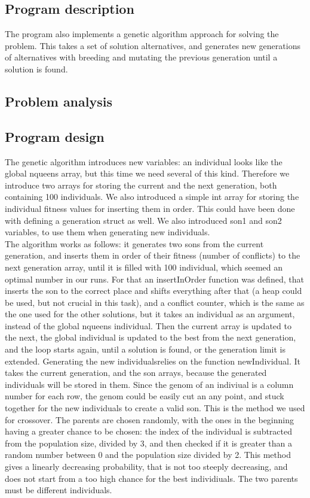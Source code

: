 \documentclass{article}
\begin{document}
\subsection*{Program description}
The program also implements a genetic algorithm approach for solving the problem. This takes a set of solution alternatives, and generates new generations of alternatives with breeding and mutating the previous generation until a solution is found.
\subsection*{Problem analysis}


\subsection*{Program design}
The genetic algorithm introduces new variables: an individual looks like the global nqueens array, but this time we need several of this kind. Therefore we introduce two arrays for storing the current and the next generation, both containing 100 individuals. We also introduced a simple int array for storing the individual fitness values for inserting them in order. This could have been done with defining a generation struct as well. We also introduced son1 and son2 variables, to use them when generating new individuals.\\
The algorithm works as follows: it generates two sons from the current generation, and inserts them in order of their fitness (number of conflicts) to the next generation array, until it is filled with 100 individual, which seemed an optimal number in our runs. For that an insertInOrder function was defined, that inserts the son to the correct place and shifts everything after that (a heap could be used, but not crucial in this task), and a conflict counter, which is the same as the one used for the other solutions, but it takes an individual as an argument, instead of the global nqueens individual. Then the current array is updated to the next, the global individual is updated to the best from the next generation, and the loop starts again, until a solution is found, or the generation limit is extended.
Generating the new individualsrelies on the function newIndividual. It takes the current generation, and the son arrays, because the generated individuals will be stored in them. Since the genom of an indiviual is a column number for each row, the genom could be easily cut an any point, and stuck together for the new individuals to create a valid son. This is the method we used for crossover. The parents are chosen randomly, with the ones in the beginning having a greater chance to be chosen: the index of the individual is subtracted from the population size, divided by 3, and then checked if it is greater than a random number between 0 and the population size divided by 2. This method gives a linearly decreasing probability, that is not too steeply decreasing, and does not start from a too high chance for the best individiuals. The two parents must be different individuals.
\end{document}
